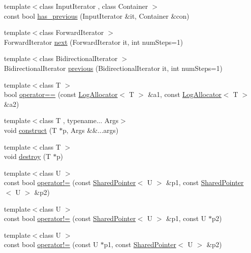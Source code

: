\begin{DoxyCompactItemize}
\item 
{\footnotesize template$<$class Input\+Iterator , class Container $>$ }\\const bool \hyperlink{namespaceprism_af20b814018d65b46e6d08eb450c176c9}{has\+\_\+previous} (Input\+Iterator \&it, Container \&con)
\item 
{\footnotesize template$<$class Forward\+Iterator $>$ }\\Forward\+Iterator \hyperlink{namespaceprism_a16771cef03b7354150e188f4ce10f6b1}{next} (Forward\+Iterator it, int num\+Steps=1)
\item 
{\footnotesize template$<$class Bidirectional\+Iterator $>$ }\\Bidirectional\+Iterator \hyperlink{namespaceprism_a8370841f58d9898247afa42c49a7658d}{previous} (Bidirectional\+Iterator it, int num\+Steps=1)
\item 
{\footnotesize template$<$class T $>$ }\\bool \hyperlink{namespaceprism_a7f163cf0ef281768da60b400045aa8d8}{operator==} (const \hyperlink{classprism_1_1_log_allocator}{Log\+Allocator}$<$ T $>$ \&a1, const \hyperlink{classprism_1_1_log_allocator}{Log\+Allocator}$<$ T $>$ \&a2)
\item 
{\footnotesize template$<$class T , typename... Args$>$ }\\void \hyperlink{namespaceprism_af62c0c26668facbe5607e8915442010e}{construct} (T $\ast$p, Args \&\&...args)
\item 
{\footnotesize template$<$class T $>$ }\\void \hyperlink{namespaceprism_af889ac2726920ab1b4f5361e6563d041}{destroy} (T $\ast$p)
\item 
{\footnotesize template$<$class U $>$ }\\const bool \hyperlink{namespaceprism_a9df924e4deb059bf1200701c8235410a}{operator!=} (const \hyperlink{classprism_1_1_shared_pointer}{Shared\+Pointer}$<$ U $>$ \&p1, const \hyperlink{classprism_1_1_shared_pointer}{Shared\+Pointer}$<$ U $>$ \&p2)
\item 
{\footnotesize template$<$class U $>$ }\\const bool \hyperlink{namespaceprism_ad6391c124e006b0e3a3ec67f55e208b0}{operator!=} (const \hyperlink{classprism_1_1_shared_pointer}{Shared\+Pointer}$<$ U $>$ \&p1, const U $\ast$p2)
\item 
{\footnotesize template$<$class U $>$ }\\const bool \hyperlink{namespaceprism_ab8792dbd5cac5678390843bacdb69daa}{operator!=} (const U $\ast$p1, const \hyperlink{classprism_1_1_shared_pointer}{Shared\+Pointer}$<$ U $>$ \&p2)

\end{DoxyCompactItemize}
